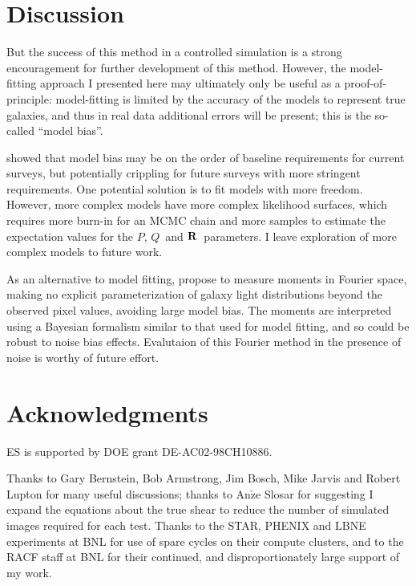 \documentclass[usegraphicx,usenatbib]{mn2e}
\newcommand{\vecQ}{\mbox{\boldmath $Q$}}
\newcommand{\matR}{\mbox{$\bf R$}}
\begin{document}
\section{Discussion} \label{sec:summary}

But the success of this method in a controlled simulation is a strong
encouragement for further development of this method.  However, the
model-fitting approach I presented here may ultimately only be useful as a
proof-of-principle: model-fitting is limited by the accuracy of the models to
represent true galaxies, and thus in real data additional errors will be
present; this is the so-called ``model bias''.  

\cite{Kacprzak13} showed that model bias may be on the order of baseline
requirements for current surveys, but potentially crippling for future surveys
with more stringent requirements. One potential solution is to fit models with
more freedom.  However, more complex models have more complex likelihood
surfaces, which requires more burn-in for an MCMC chain and more samples to
estimate the expectation values for the $P$, \vecQ\ and \matR\ parameters.
I leave exploration of more complex models to future work.

As an alternative to model fitting, \cite{ba14} propose to measure moments in
Fourier space, making no explicit parameterization of galaxy light
distributions beyond the observed pixel values, avoiding large model bias.  The
moments are interpreted using a Bayesian formalism similar to that used for model
fitting, and so could be robust to noise bias effects.  Evalutaion of this
Fourier method in the presence of noise is worthy of future effort.

\section*{Acknowledgments}

ES is supported by DOE grant DE-AC02-98CH10886.

Thanks to Gary Bernstein, Bob Armstrong, Jim Bosch, Mike Jarvis and Robert
Lupton for many useful discussions; thanks to An$\check{\textrm{z}}$e Slosar for
suggesting I expand the equations about the true shear to reduce the number of
simulated images required for each test.  Thanks to the STAR, PHENIX and LBNE
experiments at BNL for use of spare cycles on their compute clusters, and to
the RACF staff at BNL for their continued, and disproportionately large support
of my work.




\end{document}
